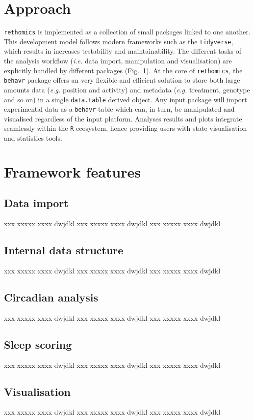 \documentclass{bioinfo}
\begin{document}
\section{Approach}
\texttt{rethomics} is implemented as a collection of small packages linked to one another.
This development model follows modern frameworks such as the \texttt{tidyverse}, which results in increases testability and maintainability.
The different tasks of the analysis workflow (\emph{i.e.} data import, manipulation and visualisation)
are explicitly handled by different packages (Fig.~1\vphantom{\ref{fig:01}}).
At the core of \texttt{rethomics}, the \texttt{behavr} package offers an very flexible and efficient solution to store both large amounts data (\emph{e.g.} position and activity) and metadata (\emph{e.g.} treatment, genotype and so on) in a single \texttt{data.table} derived object.
Any input package will import experimental data as a \texttt{behavr} table which can, in turn, be manipulated and visualised regardless of the input platform.
Analyses results and plots integrate seamlessly within the \texttt{R} ecosystem, hence providing users with state visualisation and statistics tools.


\section{Framework  features}
\subsection{Data import}
xxx xxxxx xxxx dwjdkl xxx xxxxx xxxx dwjdkl xxx xxxxx xxxx dwjdkl 
\subsection{Internal data structure}
xxx xxxxx xxxx dwjdkl xxx xxxxx xxxx dwjdkl xxx xxxxx xxxx dwjdkl 
\subsection{Circadian analysis}
xxx xxxxx xxxx dwjdkl xxx xxxxx xxxx dwjdkl xxx xxxxx xxxx dwjdkl 
\subsection{Sleep scoring}
xxx xxxxx xxxx dwjdkl xxx xxxxx xxxx dwjdkl xxx xxxxx xxxx dwjdkl 
\subsection{Visualisation}
xxx xxxxx xxxx dwjdkl xxx xxxxx xxxx dwjdkl xxx xxxxx xxxx dwjdkl 
\end{document}

